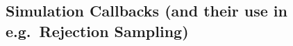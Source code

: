 \documentclass{manual}
\begin{document}
\begin{empfile}
\subsection{Simulation Callbacks (and their use in e.g.\ Rejection Sampling)}
\label{sec:rejection-sampling}


\end{empfile}
\end{document}
